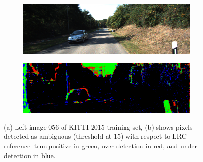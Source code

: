 \documentclass{article}
\begin{document}

\begin{figure}[ht]
\centering        
        \begin{subfigure}[t]{0.98\linewidth}
                \includegraphics[width=0.99\linewidth]{Figures/56}
                \caption{}
        \end{subfigure}
        \begin{subfigure}[t]{0.98\linewidth}
                \includegraphics[width=0.99\linewidth]{Figures/Occ_56}
                \caption{}
        \end{subfigure}  
        \caption{(a) Left image 056 of KITTI 2015 training set, (b) shows pixels detected as ambiguous (threshold at $15$) with respect to LRC reference: true positive in green, over detection in red, and under-detection in blue.}
\label{fig:occ} 
\end{figure}
\end{document}

